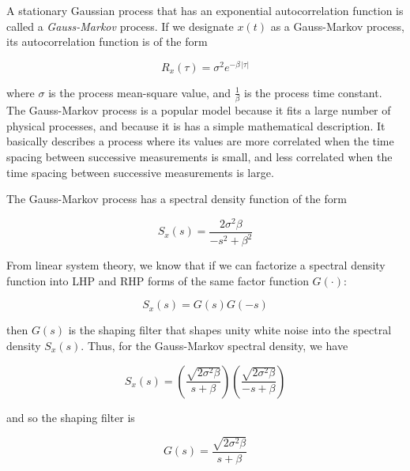 \documentclass[12pt]{article}
\begin{document}
A stationary Gaussian process that has an exponential autocorrelation function is called
a \emph{Gauss-Markov} process. If we designate $x(t)$ as a Gauss-Markov process, its
autocorrelation function is of the form

\begin{equation}
    R_x(\tau) = \sigma^2 e^{-\beta \, \lvert \tau \rvert}
    \label{eq:GM-autocorrelation}
\end{equation}

where $\sigma$ is the process mean-square value, and $\frac{1}{\beta}$ is the process time
constant. The Gauss-Markov process is a popular model because it fits a large number of
physical processes, and because it is has a simple mathematical description. It basically
describes a process where its values are more correlated when the time spacing between
successive measurements is small, and less correlated when the time spacing between
successive measurements is large.

The Gauss-Markov process has a spectral density function of the form

\begin{equation}
    S_x(s) = \frac{2 \sigma^2 \beta}{-s^2 + \beta^2}
    \label{eq:GM-spectral-function}
\end{equation}

From linear system theory, we know that if we can factorize a spectral density function
into LHP and RHP forms of the same factor function $G(\cdot)$:

\begin{equation}
    S_x(s) = G(s) G(-s)
    \label{eq:Spectral-factorization}
\end{equation}

then $G(s)$ is the shaping filter that shapes unity white noise into the spectral density
$S_x(s)$. Thus, for the Gauss-Markov spectral density, we have

\begin{equation}
    S_x(s) = \left ( \frac{\sqrt{2 \sigma^2 \beta}}{s + \beta} \right ) \left ( \frac{\sqrt{2 \sigma^2 \beta}}{-s + \beta} \right )
    \label{eq:GM-spectral-factorization}
\end{equation}

and so the shaping filter is

\begin{equation}
    G(s) = \frac{\sqrt{2 \sigma^2 \beta}}{s + \beta}
    \label{eq:GM-shaping-filter}
\end{equation}
\end{document}
